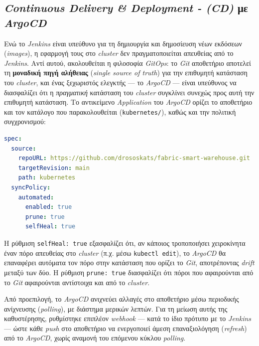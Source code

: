 \subsection{\textit{Continuous Delivery \& Deployment - (CD)} με \textit{ArgoCD}}

Ενώ το \textit{Jenkins} είναι υπεύθυνο για τη δημιουργία και δημοσίευση νέων εκδόσεων (\textit{images}), η εφαρμογή τους στο \textit{cluster} δεν πραγματοποιείται απευθείας από το \textit{Jenkins}. Αντί αυτού, ακολουθείται η φιλοσοφία \textit{GitOps}: το \textit{Git} αποθετήριο αποτελεί τη \textbf{μοναδική πηγή αλήθειας} (\textit{single source of truth}) για την επιθυμητή κατάσταση του \textit{cluster}, και ένας ξεχωριστός ελεγκτής --- το \textit{ArgoCD} --- είναι υπεύθυνος να διασφαλίζει ότι η \textit{πραγματική} κατάσταση του \textit{cluster} συγκλίνει συνεχώς προς αυτή την επιθυμητή κατάσταση.
\newpage
Το αντικείμενο \textit{Application} του \textit{ArgoCD} ορίζει το αποθετήριο και τον κατάλογο που παρακολουθείται (\texttt{kubernetes/}), καθώς και την πολιτική συγχρονισμού:

\begin{lstlisting}[language=yaml, caption={ArgoCD Application manifest για το συγχρονισμό του repository}]
spec:
  source:
    repoURL: https://github.com/drososkats/fabric-smart-warehouse.git
    targetRevision: main
    path: kubernetes
  syncPolicy:
    automated:
      enabled: true
      prune: true
      selfHeal: true
\end{lstlisting}

Η ρύθμιση \texttt{selfHeal: true} εξασφαλίζει ότι, αν κάποιος τροποποιήσει χειροκίνητα έναν πόρο απευθείας στο \textit{cluster} (π.χ. μέσω \texttt{kubectl edit}), το \textit{ArgoCD} θα επαναφέρει αυτόματα τον πόρο στην κατάσταση που ορίζει το \textit{Git}, αποτρέποντας \textit{drift} μεταξύ των δύο. Η ρύθμιση \texttt{prune: true} διασφαλίζει ότι πόροι που αφαιρούνται από το \textit{Git} αφαιρούνται αντίστοιχα και από το \textit{cluster}.

Από προεπιλογή, το \textit{ArgoCD} ανιχνεύει αλλαγές στο αποθετήριο μέσω περιοδικής ανίχνευσης (\textit{polling}), με διάστημα μερικών λεπτών. Για τη μείωση αυτής της καθυστέρησης, ρυθμίστηκε επιπλέον \textit{webhook} --- κατά το ίδιο πρότυπο με το \textit{Jenkins} --- ώστε κάθε \textit{push} στο αποθετήριο να ενεργοποιεί άμεση επαναξιολόγηση (\textit{refresh}) από το \textit{ArgoCD}, χωρίς αναμονή του επόμενου κύκλου \textit{polling}.

